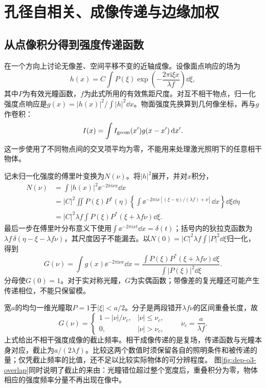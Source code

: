 \section{孔径自相关、成像传递与边缘加权}
\subsection{从点像积分得到强度传递函数}
在一个方向上讨论无像差、空间平移不变的近轴成像。设像面点响应的场为
\[
 h(x)=C\int P(\xi)\exp\!\left(-\frac{2\pi\mathrm i\xi x}{\lambda f}\right)\dd\xi,
\]
其中$P$为有效光瞳函数，$f$为此式所用的有效焦距尺度。对互不相干物点，归一化强度点响应是$g(x)=|h(x)|^2/\int|h|^2\dd x$。物面强度先换算到几何像坐标，再与$g$作卷积：
\[
 I(x)=\int I_{\rm geom}(x')g(x-x')\mathop{}\!\mathrm d x'.
\]
这一步使用了不同物点间的交叉项平均为零，不能用来处理激光照明下的任意相干物体。

记未归一化强度的傅里叶变换为$N(\nu)$。将$|h|^2$展开，并对$x$积分，
\begin{align*}
 N(\nu)&=\int |h(x)|^2\ee^{-2\pi i\nu x}\dd x\\
 &=|C|^2\iint P(\xi)P^*(\eta)
 \left\{\int\ee^{-2\pi ix[(\xi-\eta)/(\lambda f)+\nu]}\dd x\right\}
 \dd\xi\dd\eta\\
 &=|C|^2\lambda f\int
 P(\xi)P^*(\xi+\lambda f\nu)\dd\xi.
\end{align*}
最后一步在傅里叶分布意义下使用$\int\ee^{-2\pi ixt}\dd x=\delta(t)$；括号内的狄拉克函数为$\lambda f\,\delta(\eta-\xi-\lambda f\nu)$，其尺度因子不能漏去。以$N(0)=|C|^2\lambda f\int|P|^2\dd\xi$归一化，得到
\[
 G(\nu)=\int g(x)\ee^{-2\pi\mathrm i\nu x}\dd x
 =\frac{\int P(\xi)P^*(\xi+\lambda f\nu)\dd\xi}
 {\int |P(\xi)|^2\dd\xi}.
\]
分母使$G(0)=1$。对于实对称光瞳，$G$为实偶函数；带像差的复光瞳还可能产生传递相位，不能只保留模。

宽$a$的均匀一维光瞳取$P=1$于$|\xi|<a/2$。分子是两段错开$\lambda f\nu$的区间重叠长度，故
\[
 G(\nu)=\begin{cases}1-|\nu|/\nu_c,&|\nu|\leq\nu_c,\\0,&|\nu|>\nu_c,
 \end{cases}\qquad \nu_c=\frac a{\lambda f}.
\]
上式给出不相干强度成像的截止频率。相干成像传递的是复场，传递函数与光瞳本身对应，截止为$a/(2\lambda f)$。比较这两个数值时须保留各自的照明条件和被传递的量；仅凭截止频率的比值，还不足以比较实际物体的可分辨程度。
图\ref{fig:dep-o3-overlap}同时说明了截止的来由：光瞳错位超过整个宽度后，重叠积分为零，物体相应的强度频率分量不再出现在像中。

